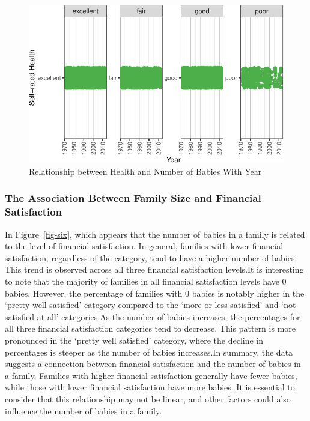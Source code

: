 \documentclass[
  letterpaper,
  DIV=11,
  numbers=noendperiod]{scrartcl}
\begin{document}
\begin{figure}

{\centering \includegraphics{paper_files/figure-pdf/fig-five-1.pdf}

}

\caption{\label{fig-five}Relationship between Health and Number of
Babies With Year}

\end{figure}

\hypertarget{the-association-between-family-size-and-financial-satisfaction}{%
\subsubsection{The Association Between Family Size and Financial
Satisfaction}\label{the-association-between-family-size-and-financial-satisfaction}}

In Figure~\ref{fig-six}, which appears that the number of babies in a
family is related to the level of financial satisfaction. In general,
families with lower financial satisfaction, regardless of the category,
tend to have a higher number of babies. This trend is observed across
all three financial satisfaction levels.It is interesting to note that
the majority of families in all financial satisfaction levels have 0
babies. However, the percentage of families with 0 babies is notably
higher in the `pretty well satisfied' category compared to the `more or
less satisfied' and `not satisfied at all' categories.As the number of
babies increases, the percentages for all three financial satisfaction
categories tend to decrease. This pattern is more pronounced in the
`pretty well satisfied' category, where the decline in percentages is
steeper as the number of babies increases.In summary, the data suggests
a connection between financial satisfaction and the number of babies in
a family. Families with higher financial satisfaction generally have
fewer babies, while those with lower financial satisfaction have more
babies. It is essential to consider that this relationship may not be
linear, and other factors could also influence the number of babies in a
family.
\end{document}
